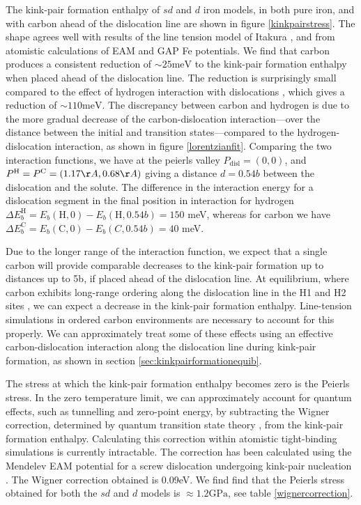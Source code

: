 \documentclass[a4paper,11pt]{article}
\begin{document}
The kink-pair formation enthalpy of \(sd\) and \(d\) iron models, in both pure
iron, and with carbon ahead of the dislocation line are shown in figure
\ref{kinkpairstress}. The shape agrees well with results of the line tension
model of Itakura \cite{Itakura2012}, and from atomistic calculations of EAM
\cite{Proville2012} and GAP \cite{Maresca2018} Fe potentials. We find that
carbon produces a consistent reduction of \(\sim 25\text{meV}\) to the
kink-pair formation enthalpy when placed ahead of the dislocation line. The
reduction is surprisingly small compared to the effect of hydrogen
interaction with dislocations
\cite{itakura13_effec_hydrog_atoms_screw_disloc}, which gives a reduction of \(\sim 110 \text{meV}\). The discrepancy between carbon and hydrogen is due to
the more gradual decrease of the carbon-dislocation interaction---over the
distance between the initial and transition states---compared to the
hydrogen-dislocation interaction, as shown in figure
\ref{lorentzianfit}. Comparing the two interaction functions, we have at the
peierls valley \(P_{\text{disl}}=(0,0)\), and \(P^{\text{H}} = P^{\text{C}} =
    (1.17 \AA, 0.68 \AA)\) giving a distance \(d = 0.54b\) between the dislocation and
the solute. The difference in the interaction energy for a dislocation
segment in the final position in interaction for hydrogen \(\Delta
    E_b^{\text{H}} = E_b(\text{H},0) - E_b(\text{H},0.54b) = 150\) meV, whereas
for carbon we have \(\Delta E_b^{\text{C}} = E_b(\text{C},0) - E_b(C,0.54b) =
    40\) meV.


Due to the longer range of the interaction function, we expect that a single carbon
will provide comparable decreases to the kink-pair formation up to distances up to 5b,
if placed ahead of the dislocation line. At equilibrium, where carbon exhibits
long-range ordering along the dislocation line in the H1 and H2 sites \cite{Luthi2019},
we can expect a decrease in the kink-pair formation enthalpy. Line-tension simulations in
ordered carbon environments are necessary to account for this properly. We can approximately
treat some of these effects using an effective carbon-dislocation interaction
along the dislocation line during kink-pair formation, as shown in section
\ref{sec:kinkpairformationequib}.



The stress at which the kink-pair formation enthalpy becomes zero is the Peierls
stress. In the zero temperature limit, we can approximately account for quantum
effects, such as tunnelling and zero-point energy, by subtracting the Wigner
correction, determined by quantum transition state theory
\cite{Proville2012,Henkelman2006}, from the kink-pair formation enthalpy. Calculating
this correction within atomistic tight-binding simulations is currently
intractable. The correction has been calculated using the Mendelev EAM potential
\cite{Mendelev2003} for a screw dislocation undergoing kink-pair nucleation
\cite{Proville2012}. The Wigner correction obtained is 0.09eV. We find find that the
Peierls stress obtained for both the \(sd\) and \(d\) models is \(\approx1.2\text{GPa}\), see table
\ref{wignercorrection}.
\end{document}
